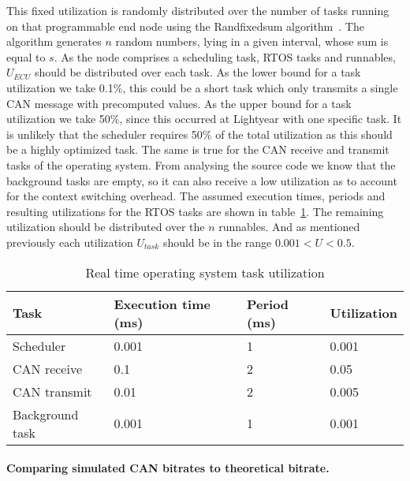 This fixed utilization is randomly distributed over the number of tasks running on that programmable end node using the Randfixedsum algorithm~\cite{emberson2010techniques}. The algorithm generates $n$ random numbers, lying in a given interval, whose sum is equal to $s$. As the node comprises a scheduling task, RTOS tasks and runnables, $U_{ECU}$ should be distributed over each task. As the lower bound for a task utilization we take 0.1\%, this could be a short task which only transmits a single CAN message with precomputed values. As the upper bound for a task utilization we take 50\%, since this occurred at Lightyear with one specific task. It is unlikely that the scheduler requires 50\% of the total utilization as this should be a highly optimized task. The same is true for the CAN receive and transmit tasks of the operating system. From analysing the source code we know that the background tasks are empty, so it can also receive a low utilization as to account for the context switching overhead. The assumed execution times, periods and resulting utilizations for the RTOS tasks are shown in table~\ref{tab:util}. The remaining utilization should be distributed over the $n$ runnables. And as mentioned previously each utilization $U_{task}$ should be in the range $0.001 < U < 0.5$.

\begin{table}[htb]
    \centering
    \begin{tabular}{@{}llll@{}}
    \toprule
    Task            & Execution time (ms) & Period (ms) & Utilization \\ \midrule
    Scheduler       & 0.001               & 1           & 0.001       \\
    CAN receive     & 0.1                 & 2           & 0.05        \\
    CAN transmit    & 0.01                & 2           & 0.005       \\
    Background task & 0.001               & 1           & 0.001       \\ \bottomrule
    \end{tabular}
    \caption{Real time operating system task utilization}
    \label{tab:util}
\end{table}

\paragraph{Comparing simulated CAN bitrates to theoretical bitrate.}

